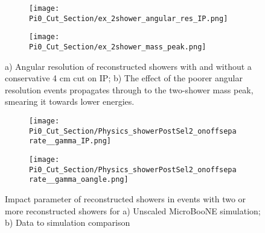 \begin{figure}[H]
  \begin{subfigure}[t]{0.4\textwidth}
	\centering
\texttt{[image: Pi0\_Cut\_Section/ex\_2shower\_angular\_res\_IP.png]}
  \caption{ }
  \end{subfigure} 
  \hspace{15mm}
  \begin{subfigure}[t]{0.4\textwidth}
	\centering
\texttt{[image: Pi0\_Cut\_Section/ex\_2shower\_mass\_peak.png]}
  \caption{ }
  \end{subfigure} 
\caption{ a) Angular resolution of reconstructed showers with and without a conservative 4 cm cut on IP; b) The effect of the poorer angular resolution events propagates through to the two-shower mass peak, smearing it towards lower energies. }
\label{fig:ex_cutjust_IP}
\end{figure}


\begin{figure}[H]
 \begin{subfigure}[t]{0.35\textwidth}
\texttt{[image: Pi0\_Cut\_Section/Physics\_showerPostSel2\_onoffseparate\_\_gamma\_IP.png]}
  \caption{ }
  \end{subfigure} 
\hspace{10mm}
 \begin{subfigure}[t]{0.35\textwidth}
    \texttt{[image: Pi0\_Cut\_Section/Physics\_showerPostSel2\_onoffseparate\_\_gamma\_oangle.png]}
  \caption{ }
  \end{subfigure} 
\caption{ Impact parameter of reconstructed showers in events with two or more reconstructed showers for a) Unscaled MicroBooNE simulation; b) Data to simulation comparison }
\label{fig:cutjust_pi0_IP}
\end{figure}


